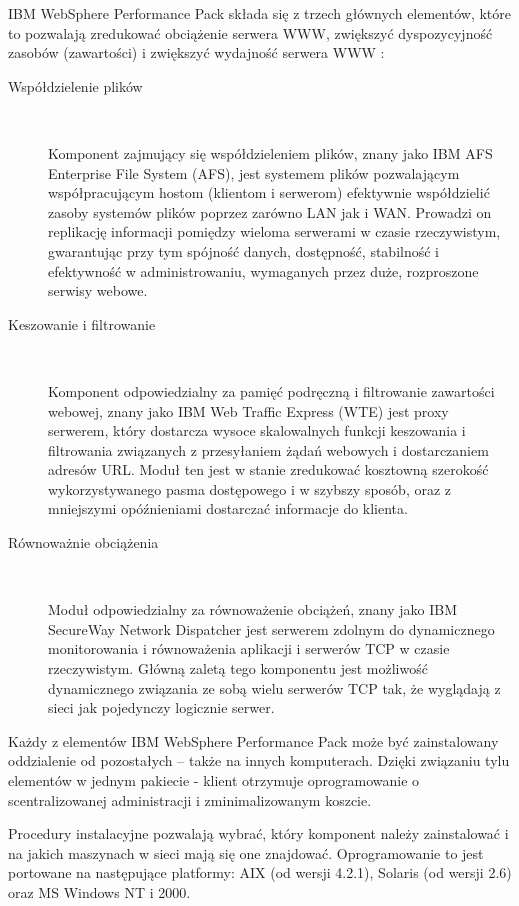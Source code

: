 IBM WebSphere Performance Pack składa się z trzech głównych elementów, które to pozwalają zredukować obciążenie serwera WWW, 
zwiększyć dyspozycyjność zasobów (zawartości) i zwiększyć wydajność serwera WWW \cite{GettingStarted}:
\begin{description}
\item[Współdzielenie plików]\

Komponent zajmujący się współdzieleniem plików, znany jako IBM AFS Enterprise File System (AFS), jest systemem plików 
pozwalającym współpracującym hostom (klientom i serwerom) efektywnie współdzielić zasoby systemów plików poprzez 
zarówno LAN jak i WAN. Prowadzi on replikację informacji pomiędzy wieloma serwerami w czasie rzeczywistym, gwarantując przy 
tym spójność danych, dostępność, stabilność i efektywność w administrowaniu, wymaganych przez duże, rozproszone serwisy webowe.
\item[Keszowanie i filtrowanie]\

Komponent odpowiedzialny za pamięć podręczną i filtrowanie zawartości webowej, znany jako IBM Web Traffic Express (WTE) jest 
proxy serwerem, który dostarcza wysoce skalowalnych funkcji keszowania i filtrowania związanych z przesyłaniem żądań webowych 
i dostarczaniem adresów URL. Moduł ten jest w stanie zredukować kosztowną szerokość wykorzystywanego pasma dostępowego i w 
szybszy sposób, oraz z mniejszymi opóźnieniami dostarczać informacje do klienta.
\item[Równoważnie obciążenia]\

Moduł odpowiedzialny za równoważenie obciążeń, znany jako IBM SecureWay Network Dispatcher jest serwerem zdolnym do 
dynamicznego monitorowania i równoważenia aplikacji i serwerów TCP w czasie rzeczywistym. Główną zaletą tego komponentu jest 
możliwość dynamicznego związania ze sobą wielu serwerów TCP tak, że wyglądają z sieci jak pojedynczy logicznie serwer.
\end{description}

Każdy z elementów IBM WebSphere Performance Pack może być zainstalowany oddzialenie od pozostałych -- także na innych 
komputerach. Dzięki związaniu tylu elementów w jednym pakiecie - klient otrzymuje oprogramowanie o scentralizowanej 
administracji i zminimalizowanym koszcie. 

Procedury instalacyjne pozwalają wybrać, który komponent należy zainstalować i na jakich maszynach w sieci mają się one 
znajdować. Oprogramowanie to jest portowane na następujące platformy: AIX (od wersji 4.2.1), Solaris (od wersji 2.6) oraz 
MS Windows NT i 2000.

